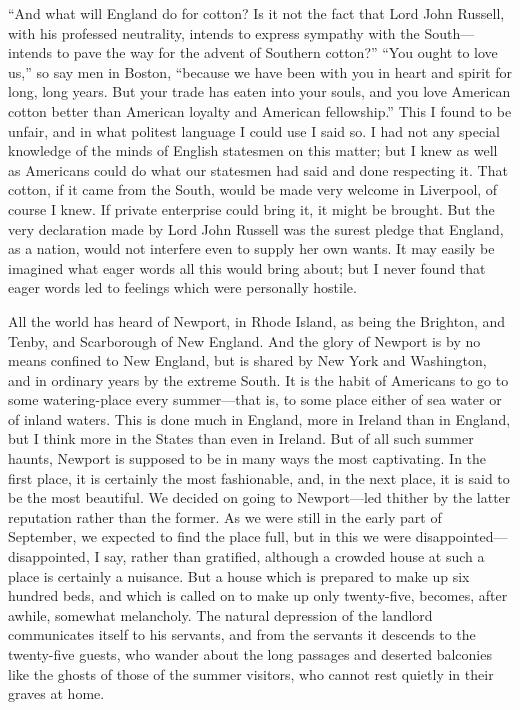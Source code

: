 ``And what will England do for cotton?  Is it not the fact that Lord
John Russell, with his professed neutrality, intends to express
sympathy with the South---intends to pave the way for the advent of
Southern cotton?''  ``You ought to love us,'' so say men in Boston,
``because we have been with you in heart and spirit for long, long
years.  But your trade has eaten into your souls, and you love
American cotton better than American loyalty and American
fellowship.''  This I found to be unfair, and in what politest
language I could use I said so.  I had not any special knowledge of
the minds of English statesmen on this matter; but I knew as well
as Americans could do what our statesmen had said and done
respecting it.  That cotton, if it came from the South, would be
made very welcome in Liverpool, of course I knew.  If private
enterprise could bring it, it might be brought.  But the very
declaration made by Lord John Russell was the surest pledge that
England, as a nation, would not interfere even to supply her own
wants.  It may easily be imagined what eager words all this would
bring about; but I never found that eager words led to feelings
which were personally hostile.

All the world has heard of Newport, in Rhode Island, as being the
Brighton, and Tenby, and Scarborough of New England.  And the glory
of Newport is by no means confined to New England, but is shared by
New York and Washington, and in ordinary years by the extreme
South.  It is the habit of Americans to go to some watering-place
every summer---that is, to some place either of sea water or of
inland waters.  This is done much in England, more in Ireland than
in England, but I think more in the States than even in Ireland.
But of all such summer haunts, Newport is supposed to be in many
ways the most captivating.  In the first place, it is certainly the
most fashionable, and, in the next place, it is said to be the most
beautiful.  We decided on going to Newport---led thither by the
latter reputation rather than the former.  As we were still in the
early part of September, we expected to find the place full, but in
this we were disappointed---disappointed, I say, rather than
gratified, although a crowded house at such a place is certainly a
nuisance.  But a house which is prepared to make up six hundred
beds, and which is called on to make up only twenty-five, becomes,
after awhile, somewhat melancholy.  The natural depression of the
landlord communicates itself to his servants, and from the servants
it descends to the twenty-five guests, who wander about the long
passages and deserted balconies like the ghosts of those of the
summer visitors, who cannot rest quietly in their graves at home.

